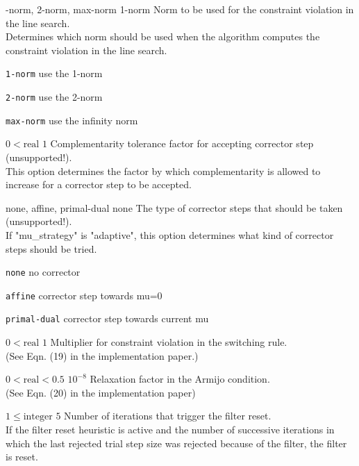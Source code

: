 %
{-norm, 2-norm, max-norm}%
{1-norm}%
{Norm to be used for the constraint violation in the line search.\\
Determines which norm should be used when the algorithm computes the constraint violation in the line search.}%
{\begin{list}{}{
\setlength{\parsep}{0em}
\setlength{\leftmargin}{5ex}
\setlength{\labelwidth}{2ex}
\setlength{\itemindent}{0ex}
\setlength{\topsep}{0pt}}
\item[\texttt{1-norm}] use the 1-norm
\item[\texttt{2-norm}] use the 2-norm
\item[\texttt{max-norm}] use the infinity norm
\end{list}
}

%
{$0<\textrm{real}$}%
{$1$}%
{Complementarity tolerance factor for accepting corrector step (unsupported!).\\
This option determines the factor by which complementarity is allowed to increase for a corrector step to be accepted.}%
{}

%
{\ttfamily none, affine, primal-dual}%
{none}%
{The type of corrector steps that should be taken (unsupported!).\\
If "mu\_strategy" is "adaptive", this option determines what kind of corrector steps should be tried.}%
{\begin{list}{}{
\setlength{\parsep}{0em}
\setlength{\leftmargin}{5ex}
\setlength{\labelwidth}{2ex}
\setlength{\itemindent}{0ex}
\setlength{\topsep}{0pt}}
\item[\texttt{none}] no corrector
\item[\texttt{affine}] corrector step towards mu=0
\item[\texttt{primal-dual}] corrector step towards current mu
\end{list}
}

%
{$0<\textrm{real}$}%
{$1$}%
{Multiplier for constraint violation in the switching rule.\\
(See Eqn. (19) in the implementation paper.)}%
{}

%
{$0<\textrm{real}<0.5$}%
{$10^{- 8}$}%
{Relaxation factor in the Armijo condition.\\
(See Eqn. (20) in the implementation paper)}%
{}

%
{$1\leq\textrm{integer}$}%
{$5$}%
{Number of iterations that trigger the filter reset.\\
If the filter reset heuristic is active and the number of successive iterations in which the last rejected trial step size was rejected because of the filter, the filter is reset.}%
{}

